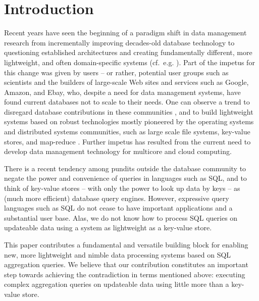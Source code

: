 \section{Introduction}


Recent years have seen the beginning of a paradigm shift in data management
research from incrementally
improving decades-old database technology
%
%
to questioning established
architectures and creating fundamentally different, more lightweight, and
often domain-specific systems (cf.\ e.g. \cite{DBLP:conf/vldb/StonebrakerMAHHH07,DBLP:journals/pvldb/KallmanKNPRZJMSZHA08}).
Part of the impetus for this change was given by users --
or rather, potential user groups such as scientists and the builders of
large-scale Web sites and services such as Google, Amazon, and Ebay,
who, despite a need for data management systems, have found current databases
not to scale to their needs.
One can observe a trend to disregard database contributions
in these communities \cite{dbcolumn, DBLP:conf/sigmod/PavloPRADMS09}, and to build lightweight systems based on
robust technologies mostly pioneered by the operating systems and distributed
systems communities, such as large scale file systems, key-value stores, and
map-reduce
\cite{DBLP:journals/cacm/DeanG08, DBLP:journals/tocs/ChangDGHWBCFG08}.
Further impetus has resulted from the current need to develop data management
technology for multicore and cloud computing.
%

There is a recent tendency among pundits
outside the database community to
negate the power and convenience of queries in languages such as SQL, and to
think of key-value stores -- with only the power to look up data by
keys -- as (much more efficient) database query engines.
%
%
However, expressive query languages such as SQL do not cease to have
important applications and a substantial user base.
Alas, we do not know how to process SQL queries on updateable data
using a system as lightweight as a key-value store.

This paper contributes a fundamental and versatile building block for
enabling new, more lightweight and nimble data processing systems based
on SQL aggregation que\-ries. We believe that our contribution
constitutes an important
step towards achieving the contradiction in terms mentioned
above: executing complex aggregation queries on updateable data
using little more than a key-value store.

